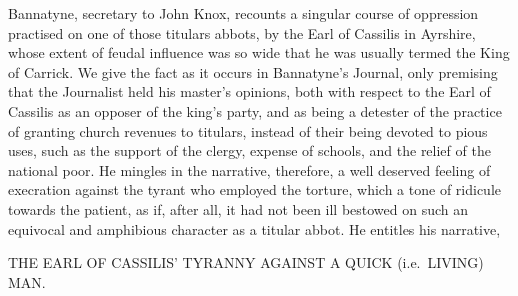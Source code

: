 Bannatyne, secretary to John Knox, recounts a singular course of
oppression practised on one of those titulars abbots, by the Earl of
Cassilis in Ayrshire, whose extent of feudal influence was so wide that
he was usually termed the King of Carrick. We give the fact as it occurs
in Bannatyne's Journal, only premising that the Journalist held his
master's opinions, both with respect to the Earl of Cassilis as an
opposer of the king's party, and as being a detester of the practice of
granting church revenues to titulars, instead of their being devoted to
pious uses, such as the support of the clergy, expense of schools, and
the relief of the national poor. He mingles in the narrative, therefore,
a well deserved feeling of execration against the tyrant who employed
the torture, which a tone of ridicule towards the patient, as if, after
all, it had not been ill bestowed on such an equivocal and amphibious
character as a titular abbot. He entitles his narrative,

\noindent THE EARL OF CASSILIS' TYRANNY AGAINST A QUICK (i.e.~LIVING) MAN.

